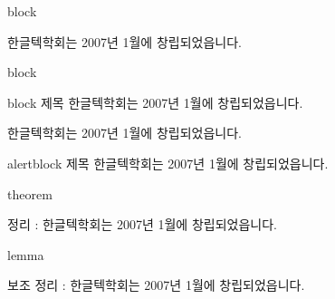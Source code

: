 \documentclass[10pt,blue,xcolor=pdftex,dvipsnames,table,handout]{beamer}
\begin{document}

		\begin{frame}[t]{block}

			\begin{block} {}
			한글텍학회는 2007년 1월에 창립되었읍니다.	
			\end{block}

		\end{frame}




		\begin{frame}[t]{block}

			\begin{block} {block 제목}
			한글텍학회는 2007년 1월에 창립되었읍니다.	
			\end{block}

			\begin{example}
			한글텍학회는 2007년 1월에 창립되었읍니다.	
			\end{example}

			\begin{alertblock} {alertblock 제목}
			한글텍학회는 2007년 1월에 창립되었읍니다.	
			\end{alertblock}

		\end{frame}

		\begin{frame}[t]{theorem}
			\begin{theorem}
			정리 : 한글텍학회는 2007년 1월에 창립되었읍니다.	
			\end{theorem}
		\end{frame}

		\begin{frame}[t]{lemma}

			\begin{lemma}
			보조 정리 :  한글텍학회는 2007년 1월에 창립되었읍니다.	
			\end{lemma}

		\end{frame}
\end{document}
